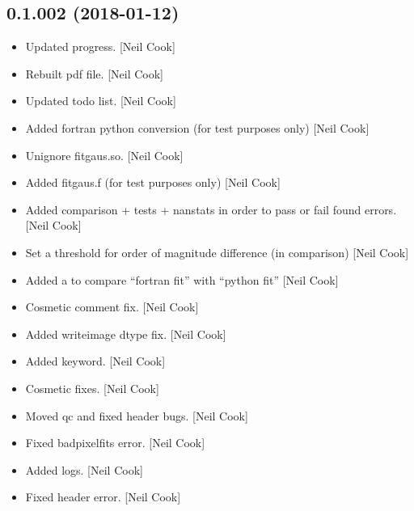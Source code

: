 \documentclass[a4paper,10pt,english]{report}
\begin{document}
\subsection{0.1.002 (2018-01-12)}
\label{\detokenize{misc/changelog:id501}}\begin{itemize}
\item {} 
Updated progress. {[}Neil Cook{]}

\item {} 
Rebuilt pdf file. {[}Neil Cook{]}

\item {} 
Updated todo list. {[}Neil Cook{]}

\item {} 
Added fortran python conversion (for test purposes only) {[}Neil Cook{]}

\item {} 
Unignore fitgaus.so. {[}Neil Cook{]}

\item {} 
Added fitgaus.f (for test purposes only) {[}Neil Cook{]}

\item {} 
Added comparison + tests + nanstats in order to pass or fail found
errors. {[}Neil Cook{]}

\item {} 
Set a threshold for order of magnitude difference (in comparison)
{[}Neil Cook{]}

\item {} 
Added a  to compare “fortran fit” with “python fit” {[}Neil
Cook{]}

\item {} 
Cosmetic comment fix. {[}Neil Cook{]}

\item {} 
Added writeimage dtype fix. {[}Neil Cook{]}

\item {} 
Added  keyword. {[}Neil Cook{]}

\item {} 
Cosmetic fixes. {[}Neil Cook{]}

\item {} 
Moved qc and fixed header bugs. {[}Neil Cook{]}

\item {} 
Fixed badpixelfits error. {[}Neil Cook{]}

\item {} 
Added logs. {[}Neil Cook{]}

\item {} 
Fixed header error. {[}Neil Cook{]}

\end{itemize}
\end{document}
